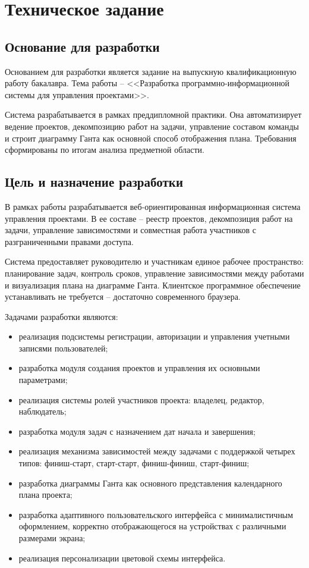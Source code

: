 \section{Техническое задание}

\subsection{Основание для разработки}

Основанием для разработки является задание на выпускную квалификационную работу бакалавра. Тема работы -- <<Разработка программно-информационной системы для управления проектами>>.

Система разрабатывается в рамках преддипломной практики. Она автоматизирует ведение проектов, декомпозицию работ на задачи, управление составом команды и строит диаграмму Ганта как основной способ отображения плана. Требования сформированы по итогам анализа предметной области.

\subsection{Цель и назначение разработки}

В рамках работы разрабатывается веб-ориентированная информационная система управления проектами. В ее составе -- реестр проектов, декомпозиция работ на задачи, управление зависимостями и совместная работа участников с разграниченными правами доступа.

Система предоставляет руководителю и участникам единое рабочее пространство: планирование задач, контроль сроков, управление зависимостями между работами и визуализация плана на диаграмме Ганта. Клиентское программное обеспечение устанавливать не требуется -- достаточно современного браузера.

Задачами разработки являются:
\begin{itemize}
    \item реализация подсистемы регистрации, авторизации и управления учетными записями пользователей;
    \item разработка модуля создания проектов и управления их основными параметрами;
    \item реализация системы ролей участников проекта: владелец, редактор, наблюдатель;
    \item разработка модуля задач с назначением дат начала и завершения;
    \item реализация механизма зависимостей между задачами с поддержкой четырех типов: финиш-старт, старт-старт, финиш-финиш, старт-финиш;
    \item разработка диаграммы Ганта как основного представления календарного плана проекта;
    \item разработка адаптивного пользовательского интерфейса с минималистичным оформлением, корректно отображающегося на устройствах с различными размерами экрана;
    \item реализация персонализации цветовой схемы интерфейса.
\end{itemize}

